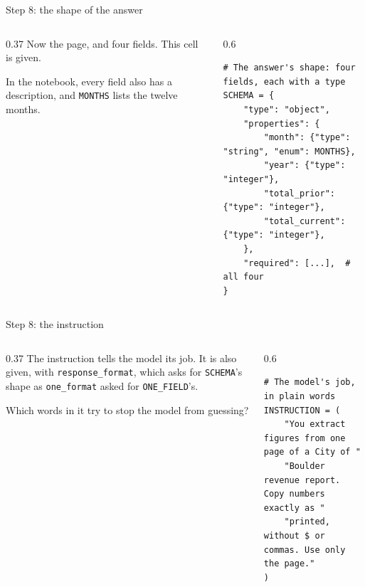 \documentclass[9pt,aspectratio=169]{beamer}
\begin{document}
\begin{frame}[fragile]{Step 8: the shape of the answer}
    \begin{columns}[T]
        \begin{column}{0.37\textwidth}
            Now the page, and four fields. This cell is given.

            \medskip
            In the notebook, every field also has a description, and \texttt{MONTHS} lists the twelve months.
        \end{column}
        \begin{column}{0.6\textwidth}
\begin{lstlisting}
# The answer's shape: four fields, each with a type
SCHEMA = {
    "type": "object",
    "properties": {
        "month": {"type": "string", "enum": MONTHS},
        "year": {"type": "integer"},
        "total_prior": {"type": "integer"},
        "total_current": {"type": "integer"},
    },
    "required": [...],  # all four
}
\end{lstlisting}
        \end{column}
    \end{columns}
\end{frame}

\begin{frame}[fragile]{Step 8: the instruction}
    \begin{columns}[T]
        \begin{column}{0.37\textwidth}
            The instruction tells the model its job. It is also given, with \texttt{response\_format}, which asks for \texttt{SCHEMA}'s shape as \texttt{one\_format} asked for \texttt{ONE\_FIELD}'s.

            \medskip
            Which words in it try to stop the model from guessing?
        \end{column}
        \begin{column}{0.6\textwidth}
\begin{lstlisting}
# The model's job, in plain words
INSTRUCTION = (
    "You extract figures from one page of a City of "
    "Boulder revenue report. Copy numbers exactly as "
    "printed, without $ or commas. Use only the page."
)
\end{lstlisting}
        \end{column}
    \end{columns}
\end{frame}
\end{document}
